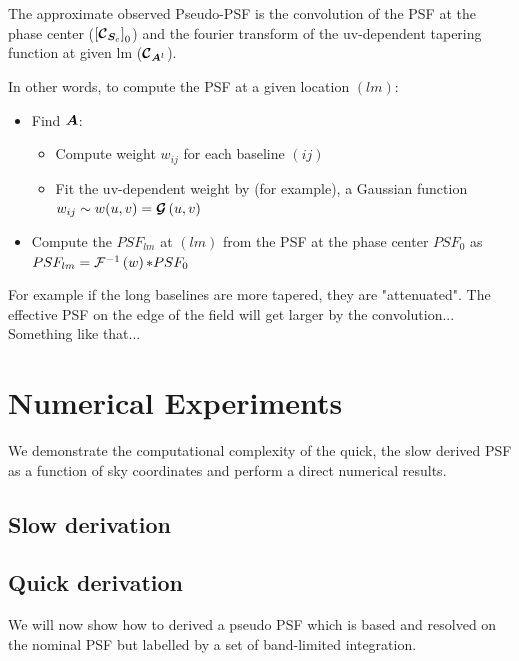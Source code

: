 The approximate observed Pseudo-PSF is the convolution of the PSF at
the phase center ($\left[\bm{\mathcal{C}}_{\bm{S}_{c}}\right]_0$) and the fourier transform of the uv-dependent tapering function at given
lm ($\bm{\mathcal{C}}_{\bm{A}^l}$).

In other words, to compute the PSF at a given location $(lm)$:

\begin{itemize}
  \item Find $\bm{A}$:
    \begin{itemize}
    \item Compute weight $w_{ij}$ for each baseline $(ij)$
    \item Fit the uv-dependent weight by (for example), a Gaussian function $w_{ij}\sim w(u,v)=\bm{\mathcal{G}}\left(u,v\right)$ 
    \end{itemize}
  \item Compute the $PSF_{lm}$ at $(lm)$ from the PSF at the phase center $PSF_0$ as $PSF_{lm}=\mathcal{F}^{-1}\left(w\right)\mathcal{*} PSF_0$
\end{itemize}
For example if the long baselines are more tapered, they are
"attenuated". The effective PSF on the edge of the field will get
larger by the convolution...
Something like that...
\section{Numerical Experiments}
We demonstrate the computational complexity of the quick, the slow derived PSF as a function of sky coordinates and 
perform a direct numerical results.
\subsection{Slow derivation}
\subsection{Quick derivation}
We will now show how to derived a pseudo PSF  which is based and resolved on the nominal PSF
but labelled by a set of band-limited integration.

